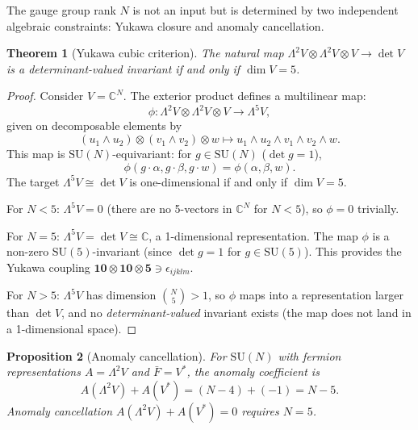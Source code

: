 \documentclass[12pt]{article}
\theoremstyle{plain}
\newtheorem{theorem}{Theorem}[section]
\newtheorem{proposition}[theorem]{Proposition}
\theoremstyle{definition}
\numberwithin{equation}{section}
\newcommand{\C}{\mathbb{C}}
\begin{document}
The gauge group rank $N$ is not an input but is determined by two independent algebraic constraints: Yukawa closure and anomaly cancellation.

\begin{theorem}[Yukawa cubic criterion]\label{thm:yukawa}
The natural map $\Lambda^2 V\otimes\Lambda^2 V\otimes V\to\det V$ is a determinant-valued invariant if and only if $\dim V=5$.
\end{theorem}

\begin{proof}
Consider $V=\C^N$.  The exterior product defines a multilinear map:
\begin{equation}
\phi:\Lambda^2 V\otimes\Lambda^2 V\otimes V\to\Lambda^5 V,
\end{equation}
given on decomposable elements by
\begin{equation}
(u_1\wedge u_2)\otimes(v_1\wedge v_2)\otimes w \mapsto u_1\wedge u_2\wedge v_1\wedge v_2\wedge w.
\end{equation}
This map is $\mathrm{SU}(N)$-equivariant: for $g\in\mathrm{SU}(N)$ ($\det g=1$),
\begin{equation}
\phi(g\cdot\alpha,g\cdot\beta,g\cdot w) = \phi(\alpha,\beta,w).
\end{equation}
The target $\Lambda^5 V\cong\det V$ is one-dimensional if and only if $\dim V=5$.

For $N<5$: $\Lambda^5 V=0$ (there are no 5-vectors in $\C^N$ for $N<5$), so $\phi=0$ trivially.

For $N=5$: $\Lambda^5 V=\det V\cong\C$, a 1-dimensional representation.  The map $\phi$ is a non-zero $\mathrm{SU}(5)$-invariant (since $\det g=1$ for $g\in\mathrm{SU}(5)$).  This provides the Yukawa coupling $\mathbf{10}\otimes\mathbf{10}\otimes\mathbf{5}\ni\epsilon_{ijklm}$.

For $N>5$: $\Lambda^5 V$ has dimension $\binom{N}{5}>1$, so $\phi$ maps into a representation larger than $\det V$, and no \emph{determinant-valued} invariant exists (the map does not land in a 1-dimensional space).
\end{proof}

\begin{proposition}[Anomaly cancellation]\label{prop:anomaly}
For $\mathrm{SU}(N)$ with fermion representations $A=\Lambda^2 V$ and $\bar{F}=V^*$, the anomaly coefficient is
\begin{equation}
A(\Lambda^2 V)+A(V^*) = (N-4)+(-1) = N-5.
\end{equation}
Anomaly cancellation $A(\Lambda^2 V)+A(V^*)=0$ requires $N=5$.
\end{proposition}
\end{document}
